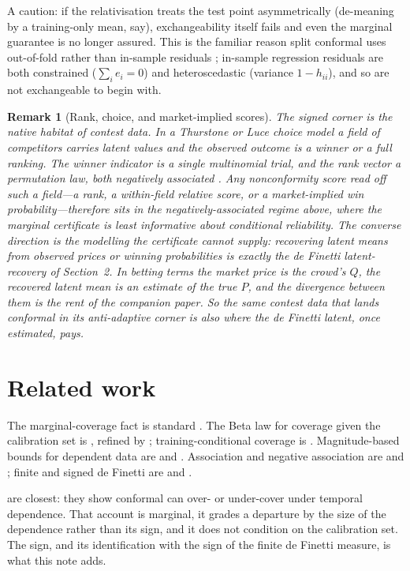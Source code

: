 \documentclass[11pt]{article}
\newtheorem{remark}{Remark}
\begin{document}
A caution: if the relativisation treats the test point asymmetrically (de-meaning by a
training-only mean, say), exchangeability itself fails and even the marginal guarantee is no
longer assured. This is the familiar reason split conformal uses out-of-fold rather than
in-sample residuals \citep{lei2018}; in-sample regression residuals are both constrained
($\sum_i e_i=0$) and heteroscedastic (variance $1-h_{ii}$), and so are not exchangeable to
begin with.

\begin{remark}[Rank, choice, and market-implied scores]
The signed corner is the native habitat of contest data. In a Thurstone or Luce choice model a
field of competitors carries latent values and the observed outcome is a winner or a full
ranking. The winner indicator is a single multinomial trial, and the rank vector a
permutation law, both \emph{negatively associated} \citep{joagdev1983}. Any nonconformity score
read off such a field---a rank, a within-field relative score, or a market-implied win
probability---therefore sits in the negatively-associated regime above, where the marginal
certificate is least informative about conditional reliability. The converse direction is the
modelling the certificate cannot supply: recovering latent means from observed prices or
winning probabilities \citep{cotton_horserace} is exactly the de Finetti latent-recovery of
Section~2. In betting terms the market price is the crowd's $Q$, the recovered latent mean is an
estimate of the true $P$, and the divergence between them is the rent of the companion paper.
So the same contest data that lands conformal in its anti-adaptive corner is also where the de
Finetti latent, once estimated, pays.
\end{remark}

\section{Related work}

The marginal-coverage fact is standard \citep{vovk2005}. The Beta law for coverage given the
calibration set is \citet{vovk2012}, refined by \citet{marques2024}; training-conditional
coverage is \citet{bian2023}. Magnitude-based bounds for dependent data are
\citet{barber2023beyond} and \citet{oliveira2024}. Association and negative association are
\citet{esary1967} and \citet{joagdev1983}; finite and signed de Finetti are
\citet{diaconis1980} and \citet{kerns2006,leonetti2018}.

\citet{barberpananjady2026} are closest: they show conformal can over- or under-cover under
temporal dependence. That account is marginal, it grades a departure by the size of the
dependence rather than its sign, and it does not condition on the calibration set. The sign,
and its identification with the sign of the finite de Finetti measure, is what this note adds.
\end{document}
